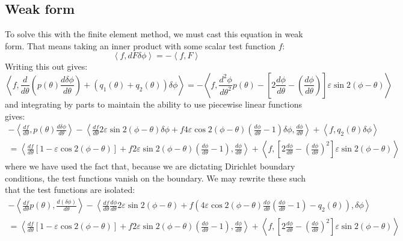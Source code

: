 \documentclass[reqno]{article}
\begin{document}
\subsection{Weak form}
To solve this with the finite element method, we must cast this equation in weak form.
That means taking an inner product with some scalar test function $f$:
\begin{equation}
        \left< f, dF \delta \phi \right>
        =
        -\left< f, F \right>
\end{equation}
Writing this out gives:
\begin{equation}
        \left< f, \frac{d}{d\theta} \left( p(\theta) \frac{d \delta \phi}{d \theta} \right)
            + (q_1 (\theta) + q_2(\theta)) \delta \phi \right>
        =
        - \left< f, \frac{d^2 \phi}{d \theta^2} p(\theta)
            - \left[2 \frac{d \phi}{d \theta} - \left( \frac{d \phi}{d \theta} \right) \right]
            \varepsilon \sin 2 (\phi - \theta)
        \right>
\end{equation}
and integrating by parts to maintain the ability to use piecewise linear functions gives:
\begin{multline}
        - \left< \frac{df}{d\theta}, p(\theta) \frac{d \delta \phi}{d\theta} \right>
        - \left< \frac{df}{d\theta} 2 \varepsilon \sin 2(\phi - \theta) \delta \phi
            + f 4 \varepsilon \cos 2 (\phi - \theta) \left( \frac{d \phi}{d\theta} - 1 \right) \delta \phi , \frac{d\phi}{d\theta} \right>
        + \left< f, q_2(\theta) \delta \phi \right> \\
        = 
        \left< \frac{df}{d\theta} \left[1 - \varepsilon \cos 2 (\phi - \theta) \right]
            + f 2 \varepsilon \sin 2 (\phi - \theta) \left(\frac{d\phi}{d \theta} - 1 \right), \frac{d\phi}{d\theta} \right>
        + \left< f, \left[ 2 \frac{d\phi}{d\theta} - \left( \frac{d\phi}{d\theta} \right)^2 \right] \varepsilon \sin 2 (\phi - \theta) \right>
\end{multline}
where we have used the fact that, because we are dictating Dirichlet boundary conditions, the test functions vanish on the boundary.
We may rewrite these such that the test functions are isolated:
\begin{multline}
    - \left< \frac{d f}{d \theta} p(\theta), \frac{d (\delta \phi)}{d\theta} \right>
    - \left< \frac{d f}{d\theta} \frac{d \phi}{d\theta} 2 \varepsilon \sin 2 (\phi - \theta)
        + f \left( 4 \varepsilon \cos 2 (\phi - \theta) \frac{d \phi}{d \theta} \left( \frac{d\phi}{d\theta} - 1 \right) - q_2 (\theta) \right), \delta \phi \right> \\
        = 
        \left< \frac{df}{d\theta} \left[1 - \varepsilon \cos 2 (\phi - \theta) \right]
            + f 2 \varepsilon \sin 2 (\phi - \theta) \left(\frac{d\phi}{d \theta} - 1 \right), \frac{d\phi}{d\theta} \right>
        + \left< f, \left[ 2 \frac{d\phi}{d\theta} - \left( \frac{d\phi}{d\theta} \right)^2 \right] \varepsilon \sin 2 (\phi - \theta) \right>
\end{multline}
\end{document}
